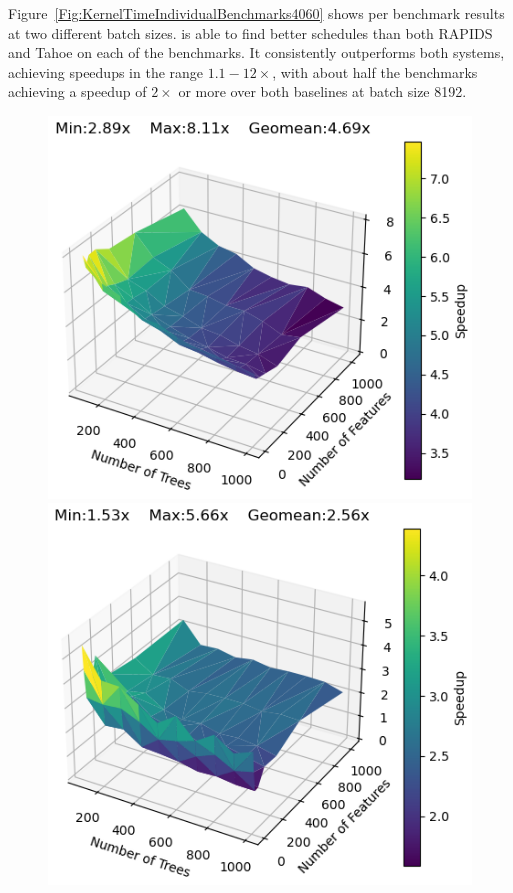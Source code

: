 Figure~\ref{Fig:KernelTimeIndividualBenchmarks4060} shows per benchmark results at two different batch sizes. 
\Treebeard{} is able to find better schedules than both RAPIDS and Tahoe on each of the benchmarks. It consistently
outperforms both systems, achieving speedups in the range $1.1-12\times$, with about half the benchmarks achieving a speedup of $2\times$ or more  over both baselines at batch size 8192.
\begin{figure}[htb]
  \begin{minipage}[t]{.475\linewidth}
    \includegraphics[width=\linewidth]{figures/RandomModels/kernel_speedup_b512_depth8.png}
  \end{minipage}
  \begin{minipage}[t]{.475\linewidth}
    \includegraphics[width=\linewidth]{figures/RandomModels/kernel_speedup_b4096_depth6.png}

\end{minipage}
\end{figure}
